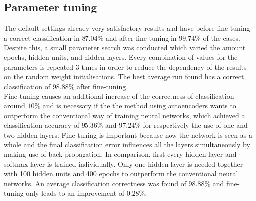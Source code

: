 \documentclass[a4paper,10pt]{article}
\begin{document}
\subsection{Parameter tuning}
The default settings already very satisfactory results and have before fine-tuning a correct classification in $ 87.04\% $  and after fine-tuning in $ 99.74\% $ of the cases. Despite this, a small parameter search was conducted which varied the amount epochs, hidden units, and hidden layers. Every combination of values for the parameters is repeated 3 times in order to reduce the dependency of the results on the random weight initialisations. The best average run found has a correct classification of $ 98.88\% $ after fine-tuning.\\

Fine-tuning causes an additional increase of the correctness of classification around $ 10\% $ and is necessary if the the method using autoencoders wants to outperform the conventional way of training neural networks, which achieved a classification accuracy of $ 95.36\% $ and $ 97.24\%$ for respectively the use of one and two hidden layers. Fine-tuning is important because now the network is seen as a whole and the final classification error influences all the layers simultaneously by making use of back propagation. In comparison, first every hidden layer and softmax layer is trained individually. Only one hidden layer is needed together with 100 hidden units and 400 epochs to outperform the conventional neural networks. An average classification correctness was found of $ 98.88\% $ and fine-tuning only leads to an improvement of $ 0.28\% $.



%
\end{document}
